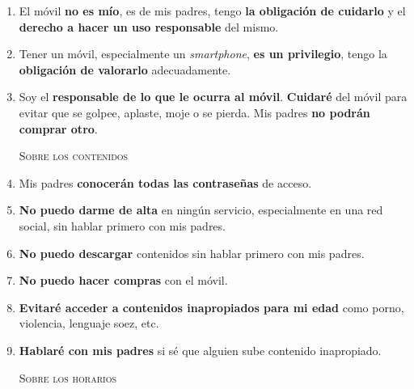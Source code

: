 \documentclass[12pt]{article}
\begin{document}
\begin{enumerate}

\item El móvil \textbf{no es mío}, es de mis padres, tengo \textbf{la
    obligación de cuidarlo} y el \textbf{derecho a hacer un uso
    responsable} del mismo.

\item Tener un móvil, especialmente un \emph{smartphone}, \textbf{es un
    privilegio}, tengo la \textbf{obligación de valorarlo}
    adecuadamente.

\item Soy el \textbf{responsable de lo que le ocurra al
    móvil}. \textbf{Cuidaré} del móvil para evitar que se golpee,
  aplaste, moje o se pierda. Mis padres \textbf{no podrán comprar otro}.

\begin{center}
  \textsc{Sobre los contenidos}
\end{center}

\item Mis padres \textbf{conocerán todas las contraseñas} de acceso.

\item \textbf{No puedo darme de alta} en ningún servicio,
  especialmente en una red social, sin hablar primero con mis
    padres.


\item \textbf{No puedo descargar} contenidos sin hablar
    primero con mis padres.

\item \textbf{No puedo hacer compras} con el móvil.

\item \textbf{Evitaré acceder a contenidos inapropiados para mi edad}
  como porno, violencia, lenguaje soez, etc.

\item \textbf{Hablaré con mis padres} si sé que alguien sube contenido inapropiado.


\begin{center}
  \textsc{Sobre los horarios}
\end{center}


\end{enumerate}
\end{document}
